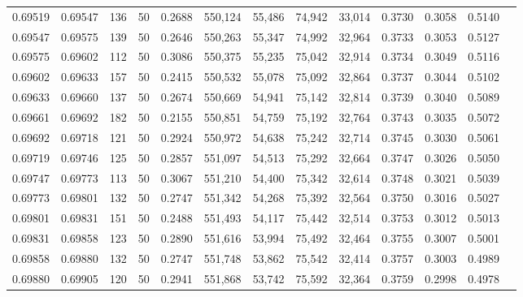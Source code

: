 \begin{tabular}{rrrrrrrrrrrrr}
0.69519 & 0.69547 &   136 &  50 &                                     0.2688 & 550,124 &  55,486 &  74,942 &  33,014 & 0.3730 & 0.3058 & 0.5140 \\
0.69547 & 0.69575 &   139 &  50 &                                     0.2646 & 550,263 &  55,347 &  74,992 &  32,964 & 0.3733 & 0.3053 & 0.5127 \\
0.69575 & 0.69602 &   112 &  50 &                                     0.3086 & 550,375 &  55,235 &  75,042 &  32,914 & 0.3734 & 0.3049 & 0.5116 \\
0.69602 & 0.69633 &   157 &  50 &                                     0.2415 & 550,532 &  55,078 &  75,092 &  32,864 & 0.3737 & 0.3044 & 0.5102 \\
0.69633 & 0.69660 &   137 &  50 &                                     0.2674 & 550,669 &  54,941 &  75,142 &  32,814 & 0.3739 & 0.3040 & 0.5089 \\
0.69661 & 0.69692 &   182 &  50 &                                     0.2155 & 550,851 &  54,759 &  75,192 &  32,764 & 0.3743 & 0.3035 & 0.5072 \\
0.69692 & 0.69718 &   121 &  50 &                                     0.2924 & 550,972 &  54,638 &  75,242 &  32,714 & 0.3745 & 0.3030 & 0.5061 \\
0.69719 & 0.69746 &   125 &  50 &                                     0.2857 & 551,097 &  54,513 &  75,292 &  32,664 & 0.3747 & 0.3026 & 0.5050 \\
0.69747 & 0.69773 &   113 &  50 &                                     0.3067 & 551,210 &  54,400 &  75,342 &  32,614 & 0.3748 & 0.3021 & 0.5039 \\
0.69773 & 0.69801 &   132 &  50 &                                     0.2747 & 551,342 &  54,268 &  75,392 &  32,564 & 0.3750 & 0.3016 & 0.5027 \\
0.69801 & 0.69831 &   151 &  50 &                                     0.2488 & 551,493 &  54,117 &  75,442 &  32,514 & 0.3753 & 0.3012 & 0.5013 \\
0.69831 & 0.69858 &   123 &  50 &                                     0.2890 & 551,616 &  53,994 &  75,492 &  32,464 & 0.3755 & 0.3007 & 0.5001 \\
0.69858 & 0.69880 &   132 &  50 &                                     0.2747 & 551,748 &  53,862 &  75,542 &  32,414 & 0.3757 & 0.3003 & 0.4989 \\
0.69880 & 0.69905 &   120 &  50 &                                     0.2941 & 551,868 &  53,742 &  75,592 &  32,364 & 0.3759 & 0.2998 & 0.4978 \\

\end{tabular}
